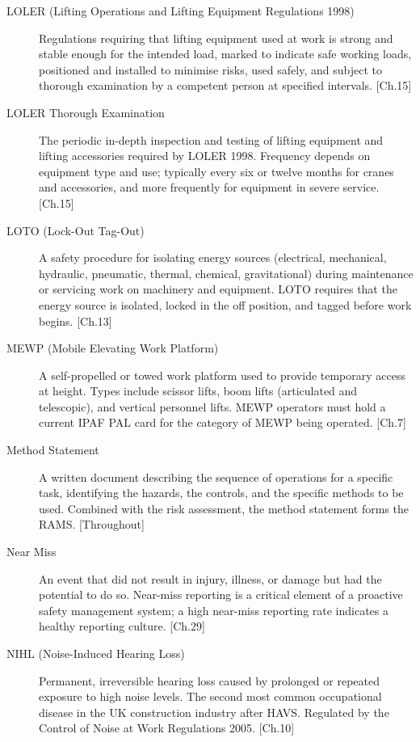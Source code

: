 \begin{description}
\item[LOLER (Lifting Operations and Lifting Equipment Regulations 1998)] Regulations requiring that lifting equipment used at work is strong and stable enough for the intended load, marked to indicate safe working loads, positioned and installed to minimise risks, used safely, and subject to thorough examination by a competent person at specified intervals. [Ch.15]

\item[LOLER Thorough Examination] The periodic in-depth inspection and testing of lifting equipment and lifting accessories required by LOLER 1998. Frequency depends on equipment type and use; typically every six or twelve months for cranes and accessories, and more frequently for equipment in severe service. [Ch.15]

\item[LOTO (Lock-Out Tag-Out)] A safety procedure for isolating energy sources (electrical, mechanical, hydraulic, pneumatic, thermal, chemical, gravitational) during maintenance or servicing work on machinery and equipment. LOTO requires that the energy source is isolated, locked in the off position, and tagged before work begins. [Ch.13]

\item[MEWP (Mobile Elevating Work Platform)] A self-propelled or towed work platform used to provide temporary access at height. Types include scissor lifts, boom lifts (articulated and telescopic), and vertical personnel lifts. MEWP operators must hold a current IPAF PAL card for the category of MEWP being operated. [Ch.7]

\item[Method Statement] A written document describing the sequence of operations for a specific task, identifying the hazards, the controls, and the specific methods to be used. Combined with the risk assessment, the method statement forms the RAMS. [Throughout]

\item[Near Miss] An event that did not result in injury, illness, or damage but had the potential to do so. Near-miss reporting is a critical element of a proactive safety management system; a high near-miss reporting rate indicates a healthy reporting culture. [Ch.29]

\item[NIHL (Noise-Induced Hearing Loss)] Permanent, irreversible hearing loss caused by prolonged or repeated exposure to high noise levels. The second most common occupational disease in the UK construction industry after HAVS. Regulated by the Control of Noise at Work Regulations 2005. [Ch.10]


\end{description}
